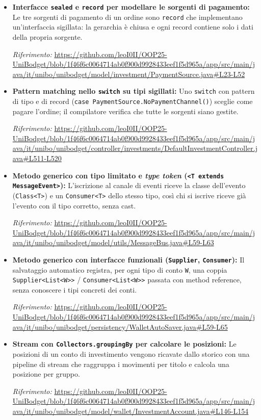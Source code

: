 \documentclass[11pt,a4paper,openright]{report}
\begin{document}
\begin{itemize}[itemsep=5pt,topsep=3pt]
    \item \textbf{Interfacce \texttt{sealed} e \texttt{record} per modellare le sorgenti di pagamento:} Le tre sorgenti di pagamento di un ordine sono \texttt{record} che implementano un'interfaccia sigillata: la gerarchia è chiusa e ogni record contiene solo i dati della propria sorgente.
    \par\emph{Riferimento:} \url{https://github.com/leoI0II/OOP25-UniBodget/blob/1f46f6c0064714ab0f900d9928433eef1f5d965a/app/src/main/java/it/unibo/unibodget/model/investment/PaymentSource.java#L23-L52}

    \item \textbf{Pattern matching nello \texttt{switch} su tipi sigillati:} Uno \texttt{switch} con pattern di tipo e di record (\texttt{case PaymentSource.NoPaymentChannel()}) sceglie come pagare l'ordine; il compilatore verifica che tutte le sorgenti siano gestite.
    \par\emph{Riferimento:} \url{https://github.com/leoI0II/OOP25-UniBodget/blob/1f46f6c0064714ab0f900d9928433eef1f5d965a/app/src/main/java/it/unibo/unibodget/controller/investments/DefaultInvestmentController.java#L511-L520}

    \item \textbf{Metodo generico con tipo limitato e \emph{type token} (\texttt{<T extends MessageEvent>}):} L'iscrizione al canale di eventi riceve la classe dell'evento (\texttt{Class<T>}) e un \texttt{Consumer<T>} dello stesso tipo, così chi si iscrive riceve già l'evento con il tipo corretto, senza cast.
    \par\emph{Riferimento:} \url{https://github.com/leoI0II/OOP25-UniBodget/blob/1f46f6c0064714ab0f900d9928433eef1f5d965a/app/src/main/java/it/unibo/unibodget/model/utils/MessageBus.java#L59-L63}

    \item \textbf{Metodo generico con interfacce funzionali (\texttt{Supplier}, \texttt{Consumer}):} Il salvataggio automatico registra, per ogni tipo di conto \texttt{W}, una coppia \texttt{Supplier<List<W>>} / \texttt{Consumer<List<W>>} passata con method reference, senza conoscere i tipi concreti dei conti.
    \par\emph{Riferimento:} \url{https://github.com/leoI0II/OOP25-UniBodget/blob/1f46f6c0064714ab0f900d9928433eef1f5d965a/app/src/main/java/it/unibo/unibodget/persistency/WalletAutoSaver.java#L59-L65}

    \item \textbf{Stream con \texttt{Collectors.groupingBy} per calcolare le posizioni:} Le posizioni di un conto di investimento vengono ricavate dallo storico con una pipeline di stream che raggruppa i movimenti per titolo e calcola una posizione per gruppo.
    \par\emph{Riferimento:} \url{https://github.com/leoI0II/OOP25-UniBodget/blob/1f46f6c0064714ab0f900d9928433eef1f5d965a/app/src/main/java/it/unibo/unibodget/model/wallet/InvestmentAccount.java#L146-L154}


\end{itemize}
\end{document}
